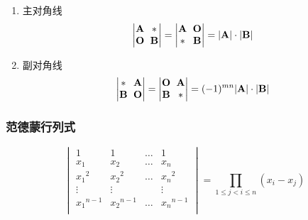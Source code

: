 \documentclass[a4paper,12pt]{article}
\begin{document}
    \begin{enumerate}
        \item 主对角线
        \[
            \renewcommand{\arraystretch}{1} %
            \setlength{\arraycolsep}{3pt}     %
            \begin{vmatrix}
                \mathbf{A} & *          \\
                \mathbf{O} & \mathbf{B}
            \end{vmatrix}
            = \begin{vmatrix}
                  \mathbf{A} & \mathbf{O} \\
                  *          & \mathbf{B}
            \end{vmatrix}
            = |\mathbf{A}| \cdot |\mathbf{B}|
        \]
        \item 副对角线
        \[
            \renewcommand{\arraystretch}{1} %
            \setlength{\arraycolsep}{3pt}     %
            \begin{vmatrix}
                *          & \mathbf{A} \\
                \mathbf{B} & \mathbf{O}
            \end{vmatrix}
            = \begin{vmatrix}
                  \mathbf{O} & \mathbf{A} \\
                  \mathbf{B} & *
            \end{vmatrix}
            = (-1)^{mn}|\mathbf{A}| \cdot |\mathbf{B}|
        \]
    \end{enumerate}

    \subsubsection{范德蒙行列式}

    \[
        \begin{vmatrix}
            1           & 1           & \dots & 1           \\
            x_1         & x_2         & \dots & x_n \\
            {x_1}^{2}   & {x_2}^2     & \dots & {x_n}^2     \\
            \vdots      & \vdots      &       & \vdots \\
            {x_1}^{n-1} & {x_2}^{n-1} & \dots & {x_n}^{n-1} \\
        \end{vmatrix}
        = \prod_{1 \le j < i \le n} (x_{i} - x_{j})
    \]
\end{document}
